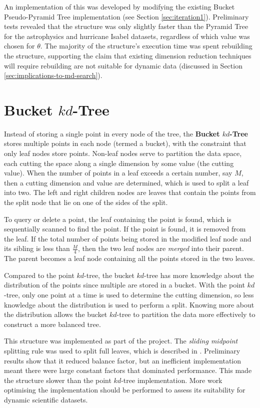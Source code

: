 An implementation of this was developed by modifying the existing Bucket Pseudo-Pyramid Tree implementation (see Section \ref{sec:iteration1}). Preliminary tests revealed that the structure was only slightly faster than the Pyramid Tree for the astrophysics and hurricane Isabel datasets, regardless of which value was chosen for $\theta$. The majority of the structure's execution time was spent rebuilding the structure, supporting the claim that existing dimension reduction techniques will require rebuilding are not suitable for dynamic data (discussed in Section \ref{sec:implications-to-md-search}).

\section{Bucket $kd$-Tree}

Instead of storing a single point in every node of the tree, the \textbf{Bucket $kd$-Tree} stores multiple points in each node (termed a bucket), with the constraint that only leaf nodes store points. Non-leaf nodes serve to partition the data space, each cutting the space along a single dimension by some value (the cutting value). When the number of points in a leaf exceeds a certain number, say $M$, then a cutting dimension and value are determined, which is used to split a leaf into two. The left and right children nodes are leaves that contain the points from the split node that lie on one of the sides of the split.

To query or delete a point, the leaf containing the point is found, which is sequentially scanned to find the point. If the point is found, it is removed from the leaf. If the total number of points being stored in the modified leaf node and its sibling is less than $\frac{M}{4}$, then the two leaf nodes are \textit{merged} into their parent. The parent becomes a leaf node containing all the points stored in the two leaves.

Compared to the point $kd$-tree, the bucket $kd$-tree has more knowledge about the distribution of the points since multiple are stored in a bucket. With the point $kd$-tree, only one point at a time is used to determine the cutting dimension, so less knowledge about the distribution is used to perform a split. Knowing more about the distribution allows the bucket $kd$-tree to partition the data more effectively to construct a more balanced tree.

This structure was implemented as part of the project. The \textit{sliding midpoint} splitting rule was used to split full leaves, which is described in \cite{sliding-midpoint-split}. Preliminary results show that it reduced balance factor, but an inefficient implementation meant there were large constant factors that dominated performance. This made the structure slower than the point $kd$-tree implementation. More work optimising the implementation should be performed to assess its suitability for dynamic scientific datasets.